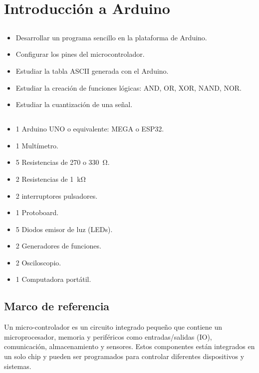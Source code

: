 \chapter{Introducción a Arduino}
\section{\obj}
\capacidad
\begin{itemize}
    \item Desarrollar un programa sencillo en la plataforma de Arduino.
    \item Configurar los pines del microcontrolador.
    \item Estudiar la tabla ASCII generada con el Arduino.
    \item Estudiar la creación de funciones lógicas: AND, OR, XOR, NAND, NOR.
    \item Estudiar la cuantización de una señal.
\end{itemize}

\section{\mat}
\begin{itemize}
\item 1 Arduino UNO o equivalente: MEGA o ESP32.
\item 1 Multímetro.
\item 5 Resistencias de 270 o \SI{330}{\ohm}.
\item 2 Resistencias de \SI{1}{\kilo\ohm}
\item 2 interruptores pulsadores.
\item 1 Protoboard.
\item 5 Diodos emisor de luz (LEDs).
\item 2 Generadores de funciones.
\item 2 Osciloscopio.
\item 1 Computadora portátil.
\end{itemize}

\section{Marco de referencia}

Un micro-controlador es un circuito integrado pequeño que contiene un microprocesador, memoria y periféricos como entradas/salidas (IO), comunicación, almacenamiento y sensores. Estos componentes están integrados en un solo chip y pueden ser programados para controlar diferentes dispositivos y sistemas.

